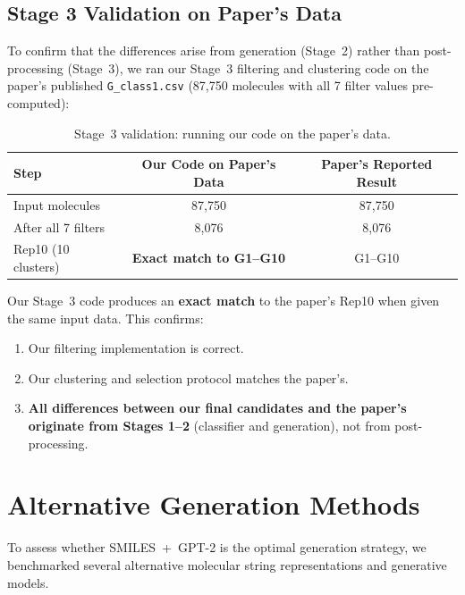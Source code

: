 \documentclass[11pt,a4paper]{article}
\begin{document}
\subsection{Stage 3 Validation on Paper's Data}
\label{sec:stage3_validation}

To confirm that the differences arise from generation (Stage~2) rather than post-processing (Stage~3), we ran our Stage~3 filtering and clustering code on the paper's published \texttt{G\_class1.csv} (87,750 molecules with all 7 filter values pre-computed):

\begin{table}[H]
\centering
\caption{Stage~3 validation: running our code on the paper's data.}
\label{tab:stage3_validation}
\begin{tabular}{lcc}
\toprule
Step & Our Code on Paper's Data & Paper's Reported Result \\
\midrule
Input molecules & 87,750 & 87,750 \\
After all 7 filters & 8,076 & 8,076 \\
Rep10 (10 clusters) & \textbf{Exact match to G1--G10} & G1--G10 \\
\bottomrule
\end{tabular}
\end{table}

Our Stage~3 code produces an \textbf{exact match} to the paper's Rep10 when given the same input data. This confirms:
\begin{enumerate}[nosep]
    \item Our filtering implementation is correct.
    \item Our clustering and selection protocol matches the paper's.
    \item \textbf{All differences between our final candidates and the paper's originate from Stages 1--2} (classifier and generation), not from post-processing.
\end{enumerate}

\section{Alternative Generation Methods}
\label{sec:alternatives}

To assess whether SMILES~+~GPT-2 is the optimal generation strategy, we benchmarked several alternative molecular string representations and generative models.
\end{document}
